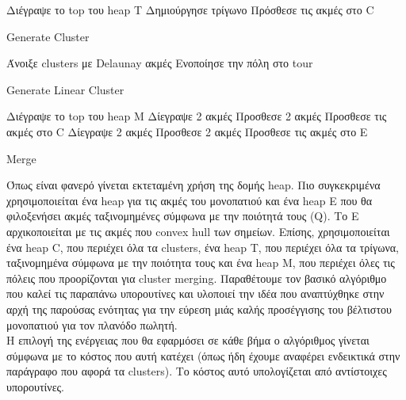 \documentclass[oneside,12pt]{book}
\theoremstyle{definition}
\begin{document}
\begin{algorithm}[H]
	\SetAlgoLined

	Διέγραψε το top του heap T \;
	Δημιούργησε τρίγωνο \;
	Πρόσθεσε τις ακμές στο C \;

	\caption{Generate Cluster}
\end{algorithm}

\begin{algorithm}[H]
	\SetAlgoLined

	{Άνοιξε clusters με Delaunay ακμές \;
	Ενοποίησε την πόλη στο tour \;}

	\caption{Generate Linear Cluster}
\end{algorithm}

\newpage

\begin{algorithm}[H]
	\SetAlgoLined

	Διέγραψε το top του heap Μ \;
	{Δίεγραψε 2 ακμές \;
	Προσθεσε 2 ακμές \;
	Προσθεσε τις ακμές στο C \;}
	\Else
	{Δίεγραψε 2 ακμές \;
	Προσθεσε 2 ακμές \;
	Προσθεσε τις ακμές στο Ε \;}

	\caption{Merge}
\end{algorithm}

Όπως είναι φανερό γίνεται εκτεταμένη χρήση της δομής heap. Πιο συγκεκριμένα χρησιμοποιείται ένα heap για τις ακμές του μονοπατιού και ένα heap Ε που θα φιλοξενήσει ακμές ταξινομημένες σύμφωνα με την ποιότητά τους (Q). Το Ε αρχικοποιείται με τις ακμές που convex hull των σημείων. Επίσης, χρησιμοποιείται ένα heap C, που περιέχει όλα τα clusters, ένα heap T, που περιέχει όλα τα τρίγωνα, ταξινομημένα σύμφωνα με την ποιότητα τους και ένα heap M, που περιέχει όλες τις πόλεις που προορίζονται για cluster merging. Παραθέτουμε τον βασικό αλγόριθμο που καλεί τις παραπάνω υπορουτίνες και υλοποιεί την ιδέα που αναπτύχθηκε στην αρχή της παρούσας ενότητας για την εύρεση μιάς καλής προσέγγισης του βέλτιστου μονοπατιού για τον πλανόδο πωλητή. \\

Η επιλογή της ενέργειας που θα εφαρμόσει σε κάθε βήμα ο αλγόριθμος γίνεται σύμφωνα με το κόστος που αυτή κατέχει (όπως ήδη έχουμε αναφέρει ενδεικτικά στην παράγραφο που αφορά τα clusters). Το κόστος αυτό υπολογίζεται από αντίστοιχες υπορουτίνες. \\
\end{document}
